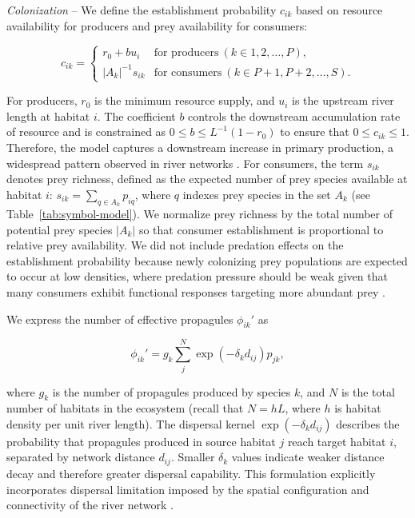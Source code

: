 \documentclass[11pt, class=article, crop=false]{standalone}
\theoremstyle{definition}
\begin{document}
\textit{Colonization} --
We define the establishment probability $c_{ik}$ based on resource availability for producers and prey availability for consumers:

\begin{equation}
    c_{ik} 
    =
        \begin{cases}
        r_0 + bu_i
        &\text{for producers}~(k \in 1, 2,\ldots,P),\\
        |A_k|^{-1} s_{ik}
        &\text{for consumers}~(k \in P + 1, P+2,\ldots,S).
        \end{cases}
    \label{eq:r-eq}
\end{equation}

For producers, $r_0$ is the minimum resource supply, and $u_i$ is the upstream river length at habitat $i$.
The coefficient $b$ controls the downstream accumulation rate of resource and is constrained as
$0 \le b \le L^{-1}(1-r_0)$ to ensure that $0 \le c_{ik}\le 1$.
Therefore, the model captures a downstream increase in primary production, a widespread pattern observed in river networks \citep{allan_stream_2007, finlay_stream_2011}.
For consumers, the term $s_{ik}$ denotes prey richness, defined as the expected number of prey species available at habitat $i$:
$s_{ik}=\sum_{q \in A_k}p_{iq}$,
where $q$ indexes prey species in the set $A_k$ (see Table~\ref{tab:symbol-model}).
We normalize prey richness by the total number of potential prey species $|A_k|$ so that consumer establishment is proportional to relative prey availability.
We did not include predation effects on the establishment probability because newly colonizing prey populations are expected to occur at low densities, where predation pressure should be weak given that many consumers exhibit functional responses targeting more abundant prey \citep{dunn_predator_2020}.

We express the number of effective propagules $\phi_{ik}'$ as

\begin{equation}
    \phi_{ik}' 
    =
    g_{k} \sum_{j}^{N} \exp(-\delta_k d_{ij}) p_{jk},
    \label{eq:clnz-local}
\end{equation}

where $g_k$ is the number of propagules produced by species $k$, and $N$ is the total number of habitats in the ecosystem (recall that $N=hL$, where $h$ is habitat density per unit river length).
The dispersal kernel $\exp(-\delta_k d_{ij})$ describes the probability that propagules produced in source habitat $j$ reach target habitat $i$, separated by network distance $d_{ij}$.
Smaller $\delta_k$ values indicate weaker distance decay and therefore greater dispersal capability.
This formulation explicitly incorporates dispersal limitation imposed by the spatial configuration and connectivity of the river network \citep{hanski_metapopulation_1999}.
\end{document}
